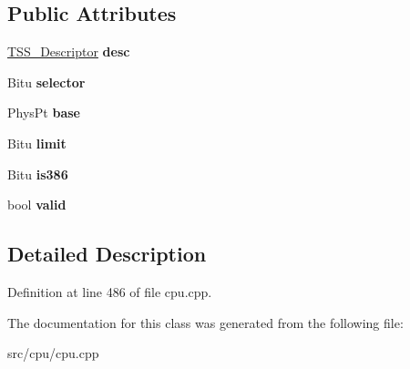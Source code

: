 \subsection*{Public Attributes}
\begin{DoxyCompactItemize}
\item 
\hypertarget{classTaskStateSegment_a46267346746acbf867d029fd39f902e3}{\hyperlink{classTSS__Descriptor}{T\-S\-S\-\_\-\-Descriptor} {\bfseries desc}}\label{classTaskStateSegment_a46267346746acbf867d029fd39f902e3}

\item 
\hypertarget{classTaskStateSegment_a0875f365d4c5477c70ed057924991bd5}{Bitu {\bfseries selector}}\label{classTaskStateSegment_a0875f365d4c5477c70ed057924991bd5}

\item 
\hypertarget{classTaskStateSegment_a95148a6c625f7821ad346627e7fe7829}{Phys\-Pt {\bfseries base}}\label{classTaskStateSegment_a95148a6c625f7821ad346627e7fe7829}

\item 
\hypertarget{classTaskStateSegment_a4dce1fe9bc4bd459bd908140219759f6}{Bitu {\bfseries limit}}\label{classTaskStateSegment_a4dce1fe9bc4bd459bd908140219759f6}

\item 
\hypertarget{classTaskStateSegment_ab002072334f2f1b417358b87e03a01e7}{Bitu {\bfseries is386}}\label{classTaskStateSegment_ab002072334f2f1b417358b87e03a01e7}

\item 
\hypertarget{classTaskStateSegment_a952e7e2635dd1b3074779a0498d74775}{bool {\bfseries valid}}\label{classTaskStateSegment_a952e7e2635dd1b3074779a0498d74775}

\end{DoxyCompactItemize}


\subsection{Detailed Description}


Definition at line 486 of file cpu.\-cpp.



The documentation for this class was generated from the following file\-:\begin{DoxyCompactItemize}
\item 
src/cpu/cpu.\-cpp\end{DoxyCompactItemize}
